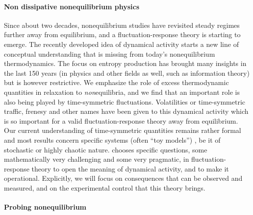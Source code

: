 \paragraph{Non dissipative nonequilibrium physics}
Since about two decades, nonequilibrium studies have revisited steady regimes further away
from equilibrium, and a fluctuation-response theory is starting to emerge.
The recently developed idea of dynamical activity starts a new line of conceptual
understanding that is missing from today's nonequilibrium thermodynamics. The focus on
entropy production has brought many insights in the last 150 years (in physics and other
fields as well, such as information theory) but is however restrictive.  We emphasize the role of excess thermodynamic quantities in relaxation to {\it non}equilibria, and we find that an important role is also being played by time-symmetric fluctuations.
Volatilities or time-symmetric traffic, frenesy and other names have been given to this dynamical activity which is so important  for a valid fluctuation-response theory away from equilibrium.
 Our current
understanding of time-symmetric quantities remains rather formal and most results concern
specific systems (often ``toy models'') , be it of stochastic or highly chaotic nature.
%
\TheProject chooses specific questions, some mathematically very challenging and some very
pragmatic, in fluctuation-response theory to open the meaning of dynamical activity, and to
make it operational.
%
Explicitly, we will focus on consequences that can be observed and measured, and on the
experimental control that this theory brings.

\paragraph{Probing nonequilibrium}


